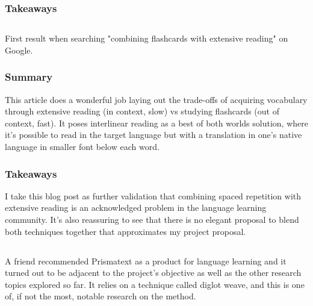 \documentclass[
	letterpaper, %
]{jdf}
\begin{document}
\subsubsection{Takeaways}


\subsection{}
First result when searching "combining flashcards with extensive reading" on Google.

\subsubsection{Summary}
This article does a wonderful job laying out the trade-offs of acquiring vocabulary through extensive reading (in context, slow) vs studying flashcards (out of context, fast). It poses interlinear reading as a best of both worlds solution, where it's possible to read in the target language but with a translation in one's native language in smaller font below each word.

\subsubsection{Takeaways}
I take this blog post as further validation that combining spaced repetition with extensive reading is an acknowledged problem in the language learning community. It's also reassuring to see that there is no elegant proposal to blend both techniques together that approximates my project proposal.

\subsection{}
A friend recommended Prismatext as a product for language learning and it turned out to be adjacent to the project's objective as well as the other research topics explored so far. It relies on a technique called diglot weave, and this is one of, if not the most, notable research on the method.
\end{document}
